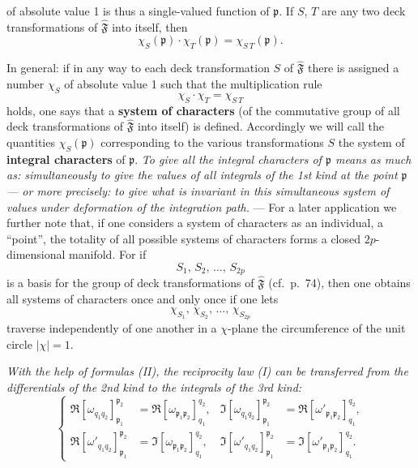 \documentclass{article}
\begin{document}
of absolute value 1 is thus a single-valued function of $\mathfrak{p}$. If $S$, $T$ are any two deck transformations of $\hat{\mathfrak{F}}$ into itself, then
\[ \chi_S(\mathfrak{p}) \cdot \chi_T(\mathfrak{p}) = \chi_{S\,T}(\mathfrak{p}). \]

In general: if in any way to each deck transformation $S$ of $\hat{\mathfrak{F}}$ there is assigned a number $\chi_S$ of absolute value 1 such that the multiplication rule
\[ \chi_S \cdot \chi_T = \chi_{S\,T} \]
holds, one says that a \textbf{system of characters} (of the commutative group of all deck transformations of $\hat{\mathfrak{F}}$ into itself) is defined. Accordingly we will call the quantities $\chi_S(\mathfrak{p})$ corresponding to the various transformations $S$ the system of \textbf{integral characters} of $\mathfrak{p}$. \emph{To give all the integral characters of $\mathfrak{p}$ means as much as: simultaneously to give the values of all integrals of the 1st kind at the point $\mathfrak{p}$ --- or more precisely: to give what is invariant in this simultaneous system of values under deformation of the integration path.} --- For a later application we further note that, if one considers a system of characters as an individual, a ``point'', the totality of all possible systems of characters forms a closed $2p$-dimensional manifold. For if
\[ S_1, \, S_2, \, \dots, \, S_{2p} \]
is a basis for the group of deck transformations of $\hat{\mathfrak{F}}$ (cf.\ p.~74), then one obtains all systems of characters once and only once if one lets
\[ \chi_{S_1}, \, \chi_{S_2}, \, \dots, \, \chi_{S_{2p}} \]
traverse independently of one another in a $\chi$-plane the circumference of the unit circle $|\chi| = 1$.

\emph{With the help of formulas (II), the reciprocity law (I) can be transferred from the differentials of the 2nd kind to the integrals of the 3rd kind:}
\[ \left\{ \begin{aligned}
\Re [\omega_{q_1 q_2}]_{\mathfrak{p}_1}^{\mathfrak{p}_2} &= \Re [\omega_{\mathfrak{p}_1 \mathfrak{p}_2}]_{q_1}^{q_2}, & \Im [\omega_{q_1 q_2}]_{\mathfrak{p}_1}^{\mathfrak{p}_2} &= \Re [\omega'_{\mathfrak{p}_1 \mathfrak{p}_2}]_{q_1}^{q_2}, \\
\Re [\omega'_{q_1 q_2}]_{\mathfrak{p}_1}^{\mathfrak{p}_2} &= \Im [\omega_{\mathfrak{p}_1 \mathfrak{p}_2}]_{q_1}^{q_2}, & \Im [\omega'_{q_1 q_2}]_{\mathfrak{p}_1}^{\mathfrak{p}_2} &= \Im [\omega'_{\mathfrak{p}_1 \mathfrak{p}_2}]_{q_1}^{q_2}.
\end{aligned} \right. \tag{III} \]
\end{document}
